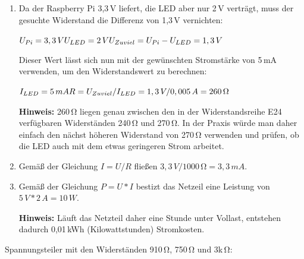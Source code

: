 \begin{enumerate}
    \item Da der Raspberry Pi 3,3\,V liefert, die LED aber nur 2\,V verträgt,
    muss der gesuchte Widerstand die Differenz von 1,3\,V \glqq{}vernichten\grqq{}:

    $
        U_{Pi} = 3,3\,V \\
        U_{LED} = 2\,V \\
        \smallskip
        U_{Zuviel} = U_{Pi} - U_{LED} = 1,3\,V
    $

    Dieser Wert lässt sich nun mit der gewünschten Stromstärke von 5\,mA verwenden,
    um den Widerstandswert zu berechnen:

    $
        I_{LED} = 5\,mA \\
        \smallskip
        R = U_{Zuviel} / I_{LED} = 1,3\,V / 0,005\,A = 260\,\si{\ohm}
    $

    \textbf{Hinweis:} 260\,\si{\ohm} liegen genau zwischen den in der Widerstandsreihe
    E24 verfügbaren Widerständen 240\,\si{\ohm} und 270\,\si{\ohm}. In der Praxis
    würde man daher einfach den nächst höheren Widerstand von 270\,\si{\ohm} verwenden
    und prüfen, ob die LED auch mit dem etwas geringeren Strom arbeitet.

    \item Gemäß der Gleichung $I = U / R$ fließen $3,3\,V / 1000\,\si{\ohm} = 3,3\,mA$.

    \item Gemäß der Gleichung $P = U * I$ bestizt das Netzeil eine Leistung von
    $5\,V * 2\,A = 10\,W$.

    \textbf{Hinweis:} Läuft das Netzteil daher eine Stunde unter Vollast, entstehen
    dadurch 0,01\,kWh (Kilowattstunden) Stromkosten.
\end{enumerate}

\teilaufgabe
Spannungsteiler mit den Widerständen 910\,\si{\ohm}, 750\,\si{\ohm} und 3k\,\si{\ohm}:

